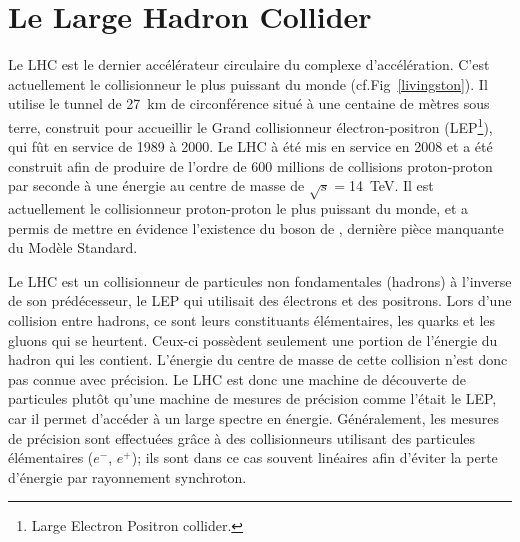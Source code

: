 \section{Le Large Hadron Collider}
Le LHC est le dernier accélérateur circulaire du complexe d'accélération. C'est actuellement le collisionneur le plus puissant du monde (cf.Fig~\ref{livingston}). Il utilise le tunnel de \SI{27}{\kilo\meter} de circonférence situé à une centaine de mètres sous terre, construit pour accueillir le Grand collisionneur électron-positron (LEP\footnote{Large Electron Positron collider.}), qui fût en service de \num{1989} à \num{2000}. Le LHC à été mis en service en \num{2008} et a été construit afin de produire de l'ordre de \num{600} millions de collisions proton-proton par seconde à une énergie au centre de masse de $\sqrt{s}=$\SI{14}{\tera\eV}. Il est actuellement le collisionneur proton-proton le plus puissant du monde, et a permis de mettre en évidence l'existence du boson de , dernière pièce manquante du Modèle Standard.

Le LHC est un collisionneur de particules non fondamentales (hadrons) à l'inverse de son prédécesseur, le LEP qui utilisait des électrons et des positrons. Lors d'une collision entre hadrons, ce sont leurs constituants élémentaires, les quarks et les gluons qui se heurtent. Ceux-ci possèdent seulement une portion de l'énergie du hadron qui les contient. L'énergie du centre de masse de cette collision n'est donc pas connue avec précision. Le LHC est donc une machine de découverte de particules plutôt qu'une machine de mesures de précision comme l'était le LEP, car il permet d'accéder à un large spectre en énergie. Généralement, les mesures de précision sont effectuées grâce à des collisionneurs utilisant des particules élémentaires ($e^{-}$, $e^{+}$); ils sont dans ce cas souvent linéaires afin d'éviter la perte d'énergie par rayonnement synchroton.

